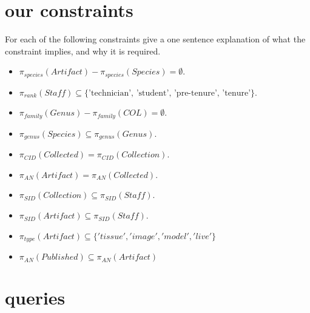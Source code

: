 \documentclass[boldsans]{article}
\begin{document}
\section*{our constraints}

For each of the following constraints give a one sentence explanation of what the
constraint implies, and why it is required.

\begin{itemize}
\item $\pi_{species}(Artifact) - \pi_{species}(Species) = \emptyset$.
\item $\pi_{rank}(Staff) \subseteq \{\text{'technician', 'student',
    'pre-tenure', 'tenure'}\}$.
\item $\pi_{family}(Genus) - \pi_{family}(COL) = \emptyset$.
\item $\pi_{genus}(Species) \subseteq \pi_{genus}(Genus)$.
\item $\pi_{CID}(Collected) = \pi_{CID} (Collection)$.
\item $\pi_{AN}(Artifact) = \pi_{AN}(Collected)$.
\item $\pi_{SID}(Collection) \subseteq \pi_{SID}(Staff)$.
\item $\pi_{SID}(Artifact) \subseteq \pi_{SID}(Staff)$.
\item $\pi_{type}(Artifact) \subseteq \{'tissue', 'image', 'model', 'live'\}$
\item $\pi_{AN}(Published) \subseteq \pi_{AN}(Artifact)$
\end{itemize}

\section*{queries}
\end{document}
